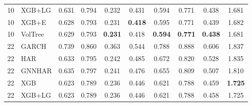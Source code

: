 \documentclass[runningheads]{llncs}
\begin{document}
\begin{table}[t]
\begin{tabular}{ll cccc cccc}
10 & XGB+LG   & 0.631 & 0.794 & 0.232 & 0.431 & 0.594 & 0.771 & 0.438 & 1.681 \\ %
10 & XGB+E    & 0.628 & 0.793 & 0.231 & \textbf{0.418} & 0.595 & 0.771 & 0.439 & 1.682 \\ %
10 & VolTree & 0.629 & 0.793 & \textbf{0.231} & 0.418 & \textbf{0.594} & \textbf{0.771} & \textbf{0.438} & 1.681 \\ %
\midrule
22 & GARCH    & 0.739 & 0.860 & 0.363 & 0.544 & 0.788 & 0.888 & 0.606 & 1.837 \\ %
22 & HAR      & 0.633 & 0.795 & 0.242 & 0.485 & 0.672 & 0.820 & 0.528 & 1.835 \\ %
22 & GNNHAR   & 0.635 & 0.797 & 0.241 & 0.476 & 0.655 & 0.809 & 0.507 & 1.810 \\ %
22 & XGB      & 0.623 & 0.789 & 0.236 & 0.446 & 0.621 & 0.788 & 0.459 & \textbf{1.725} \\ %
22 & XGB+LG   & 0.623 & 0.789 & 0.236 & 0.446 & 0.621 & 0.788 & 0.458 & 1.725 \\ %

\end{tabular}
\end{table}
\end{document}
